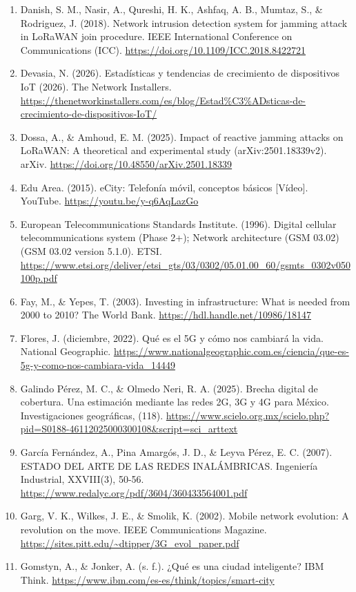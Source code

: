 \documentclass[12pt,a4paper]{article}
\begin{document}
\begin{enumerate}
    \item Danish, S. M., Nasir, A., Qureshi, H. K., Ashfaq, A. B., Mumtaz, S., \& Rodriguez, J. (2018). Network intrusion detection system for jamming attack in LoRaWAN join procedure. IEEE International Conference on Communications (ICC). \url{https://doi.org/10.1109/ICC.2018.8422721}
    \item Devasia, N. (2026). Estadísticas y tendencias de crecimiento de dispositivos IoT (2026). The Network Installers. \url{https://thenetworkinstallers.com/es/blog/Estad%C3%ADsticas-de-crecimiento-de-dispositivos-IoT/}
    \item Dossa, A., \& Amhoud, E. M. (2025). Impact of reactive jamming attacks on LoRaWAN: A theoretical and experimental study (arXiv:2501.18339v2). arXiv. \url{https://doi.org/10.48550/arXiv.2501.18339}
    \item Edu Area. (2015). eCity: Telefonía móvil, conceptos básicos [Vídeo]. YouTube. \url{https://youtu.be/y-q6AqLazGo}
    \item European Telecommunications Standards Institute. (1996). Digital cellular telecommunications system (Phase 2+); Network architecture (GSM 03.02) (GSM 03.02 version 5.1.0). ETSI. \url{https://www.etsi.org/deliver/etsi_gts/03/0302/05.01.00_60/gsmts_0302v050100p.pdf}
    \item Fay, M., \& Yepes, T. (2003). Investing in infrastructure: What is needed from 2000 to 2010? The World Bank. \url{https://hdl.handle.net/10986/18147}
    \item Flores, J. (diciembre, 2022). Qué es el 5G y cómo nos cambiará la vida. National Geographic. \url{https://www.nationalgeographic.com.es/ciencia/que-es-5g-y-como-nos-cambiara-vida_14449}
    \item Galindo Pérez, M. C., \& Olmedo Neri, R. A. (2025). Brecha digital de cobertura. Una estimación mediante las redes 2G, 3G y 4G para México. Investigaciones geográficas, (118). \url{https://www.scielo.org.mx/scielo.php?pid=S0188-46112025000300108&script=sci_arttext}
    \item García Fernández, A., Pina Amargós, J. D., \& Leyva Pérez, E. C. (2007). ESTADO DEL ARTE DE LAS REDES INALÁMBRICAS. Ingeniería Industrial, XXVIII(3), 50-56. \url{https://www.redalyc.org/pdf/3604/360433564001.pdf}
    \item Garg, V. K., Wilkes, J. E., \& Smolik, K. (2002). Mobile network evolution: A revolution on the move. IEEE Communications Magazine. \url{https://sites.pitt.edu/~dtipper/3G_evol_paper.pdf}
    \item Gomstyn, A., \& Jonker, A. (s. f.). ¿Qué es una ciudad inteligente? IBM Think. \url{https://www.ibm.com/es-es/think/topics/smart-city}

\end{enumerate}
\end{document}
